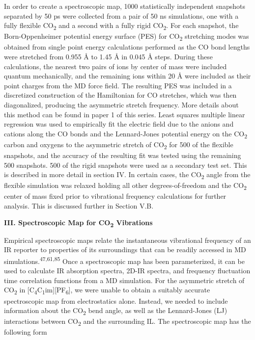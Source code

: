 \documentclass[]{article}
\begin{document}
In order to create a spectroscopic map, 1000 statistically independent
snapshots separated by 50 ps were collected from a pair of 50 ns
simulations, one with a fully flexible CO\textsubscript{2} and a second
with a fully rigid CO\textsubscript{2}. For each snapshot, the
Born-Oppenheimer potential energy surface (PES) for CO\textsubscript{2}
stretching modes was obtained from single point energy calculations
performed as the CO bond lengths were stretched from 0.955 Å to 1.45 Å
in 0.045 Å steps. During these calculations, the nearest two pairs of
ions by center of mass were included quantum mechanically, and the
remaining ions within 20 Å were included as their point charges from the
MD force field. The resulting PES was included in a discretized
construction of the Hamiltonian for CO stretches, which was then
diagonalized, producing the asymmetric stretch frequency. More details
about this method can be found in paper 1 of this series. Least squares
multiple linear regression was used to empirically fit the electric
field due to the anions and cations along the CO bonds and the
Lennard-Jones potential energy on the CO\textsubscript{2} carbon and
oxygens to the asymmetric stretch of CO\textsubscript{2} for 500 of the
flexible snapshots, and the accuracy of the resulting fit was tested
using the remaining 500 snapshots. 500 of the rigid snapshots were used
as a secondary test set. This is described in more detail in section IV.
In certain cases, the CO\textsubscript{2} angle from the flexible
simulation was relaxed holding all other degrees-of-freedom and the
CO\textsubscript{2} center of mass fixed prior to vibrational frequency
calculations for further analysis. This is discussed further in Section
V.B.

\textbf{III. Spectroscopic Map for CO\textsubscript{2} Vibrations}

Empirical spectroscopic maps relate the instantaneous vibrational
frequency of an IR reporter to properties of its surroundings that can
be readily accessed in MD simulations.\textsuperscript{47,61,85} Once a
spectroscopic map has been parameterized, it can be used to calculate IR
absorption spectra, 2D-IR spectra, and frequency fluctuation time
correlation functions from a MD simulation. For the asymmetric stretch
of CO\textsubscript{2} in
{[}C\textsubscript{4}C\textsubscript{1}im{]}{[}PF\textsubscript{6}{]},
we were unable to obtain a suitably accurate spectroscopic map from
electrostatics alone. Instead, we needed to include information about
the CO\textsubscript{2} bend angle, as well as the Lennard-Jones (LJ)
interactions between CO\textsubscript{2} and the surrounding IL. The
spectroscopic map has the following form
\end{document}
